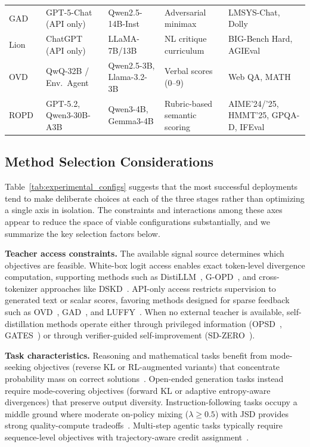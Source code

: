\documentclass{article} %
\begin{document}
\begin{table}[t]
{\begin{tabular}{@{}lllll@{}}
        GAD~\citep{2511.10643} & GPT-5-Chat (API only) & Qwen2.5-14B-Inst & Adversarial minimax & LMSYS-Chat, Dolly \\
        Lion~\citep{2305.12870} & ChatGPT (API only) & LLaMA-7B/13B & NL critique curriculum & BIG-Bench Hard, AGIEval \\
        OVD~\citep{2601.21968} & QwQ-32B / Env.~Agent & Qwen2.5-3B, Llama-3.2-3B & Verbal scores (0--9) & Web QA, MATH \\
        ROPD~\citep{2605.07396} & GPT-5.2, Qwen3-30B-A3B & Qwen3-4B, Gemma3-4B & Rubric-based semantic scoring & AIME'24/'25, HMMT'25, GPQA-D, IFEval \\
        \bottomrule
    \end{tabular}
    }
\end{table}


\subsection{Method Selection Considerations}
\label{subsec:decision_tree}

Table~\ref{tab:experimental_configs} suggests that the most successful deployments tend to make deliberate choices at each of the three stages rather than optimizing a single axis in isolation. The constraints and interactions among these axes appear to reduce the space of viable configurations substantially, and we summarize the key selection factors below.

\textbf{Teacher access constraints.} The available signal source determines which objectives are feasible. White-box logit access enables exact token-level divergence computation, supporting methods such as DistiLLM~\citep{2402.03898}, G-OPD~\citep{2602.12125}, and cross-tokenizer approaches like DSKD~\citep{2504.11426}. API-only access restricts supervision to generated text or scalar scores, favoring methods designed for sparse feedback such as OVD~\citep{2601.21968}, GAD~\citep{2511.10643}, and LUFFY~\citep{2504.14945}. When no external teacher is available, self-distillation methods operate either through privileged information (OPSD~\citep{2601.18734}, GATES~\citep{2602.20574}) or through verifier-guided self-improvement (SD-ZERO~\citep{2604.12002}).

\textbf{Task characteristics.} Reasoning and mathematical tasks benefit from mode-seeking objectives (reverse KL or RL-augmented variants) that concentrate probability mass on correct solutions~\citep{2306.08543,2602.12125,2506.02208}. Open-ended generation tasks instead require mode-covering objectives (forward KL or adaptive entropy-aware divergences) that preserve output diversity. Instruction-following tasks occupy a middle ground where moderate on-policy mixing ($\lambda \geq 0.5$) with JSD provides strong quality-compute tradeoffs~\citep{2306.13649}. Multi-step agentic tasks typically require sequence-level objectives with trajectory-aware credit assignment~\citep{2509.14257,2602.22495}.
\end{document}
